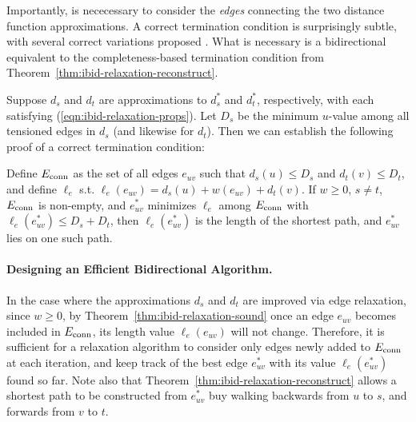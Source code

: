 Importantly, is nececessary to consider the \emph{edges} connecting
the two distance function approximations.
A correct termination condition is surprisingly subtle,%
with several correct variations proposed
\citep{nicholson1966shortest, dreyfus1969appraisalsp,
pohl1969bidirectional, goldberg2005spexternalmemory}.
What is necessary is a bidirectional equivalent to the 
completeness-based termination condition
from Theorem~\ref{thm:ibid-relaxation-reconstruct}.

Suppose $d_s$ and $d_t$ are approximations to $d^*_s$ and $d_t^*$,
respectively,
with each satisfying (\ref{eqn:ibid-relaxation-props}).
Let $D_s$ be the minimum $u$-value among all tensioned edges in $d_s$
(and likewise for $d_t$).
Then we can establish the following proof of a correct termination
condition:


\begin{theorem}
Define $E_{\mbox{\scriptsize conn}}$ as the set of all edges $e_{uv}$ such that
$d_s(u) \leq D_s$ and $d_t(v) \leq D_t$,
and define $\ell_e$ s.t. $\ell_e(e_{uv}) = d_s(u) + w(e_{uv}) + d_t(v)$.
If $w \geq 0$,
$s \neq t$,
$E_{\mbox{\scriptsize conn}}$ is non-empty,
and $e^*_{uv}$ minimizes $\ell_e$
among $E_{\mbox{\scriptsize conn}}$ with $\ell_e(e^*_{uv}) \leq D_s + D_t$,
then $\ell_e(e^*_{uv})$ is the length of the shortest path,
and $e^*_{uv}$ lies on one such path.
\label{thm:ibid-bidir-sound}
\end{theorem}

\paragraph{Designing an Efficient Bidirectional Algorithm.}
In the case where the approximations $d_s$ and $d_t$ are improved
via edge relaxation,
since $w \geq 0$,
by Theorem~\ref{thm:ibid-relaxation-sound}
once an edge $e_{uv}$ becomes included in
$E_{\mbox{\scriptsize conn}}$,
its length value $\ell_e(e_{uv})$ will not change.
Therefore,
it is sufficient for a relaxation algorithm to consider only edges
newly added to $E_{\mbox{\scriptsize conn}}$ at each iteration,
and keep track of the best edge $e^*_{uv}$
with its value $\ell_e(e^*_{uv})$ found so far.
Note also that Theorem~\ref{thm:ibid-relaxation-reconstruct}
allows a shortest path to be constructed from $e^*_{uv}$
buy walking backwards from $u$ to $s$,
and forwards from $v$ to $t$.

